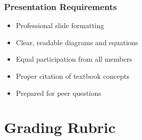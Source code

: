 \documentclass[12pt]{article}
\begin{document}
\subsubsection{Presentation Requirements}
\begin{itemize}
\item Professional slide formatting
\item Clear, readable diagrams and equations
\item Equal participation from all members
\item Proper citation of textbook concepts
\item Prepared for peer questions
\end{itemize}

\section{Grading Rubric}
\end{document}
